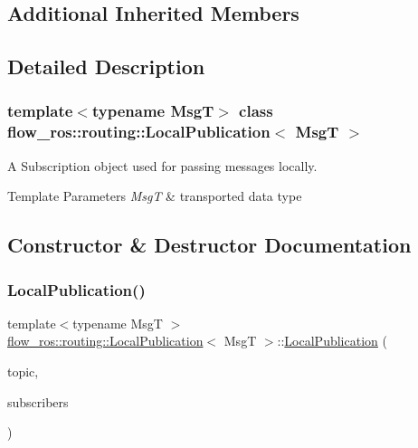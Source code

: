 \subsection*{Additional Inherited Members}


\subsection{Detailed Description}
\subsubsection*{template$<$typename MsgT$>$\newline
class flow\+\_\+ros\+::routing\+::\+Local\+Publication$<$ Msg\+T $>$}

A Subscription object used for passing messages locally. 


\begin{DoxyTemplParams}{Template Parameters}
{\em MsgT} & transported data type \\
\hline
\end{DoxyTemplParams}


\subsection{Constructor \& Destructor Documentation}
\mbox{\label{classflow__ros_1_1routing_1_1_local_publication_a1430b9009fbb39639d69faa0545b8ec8}} 
\subsubsection{\texorpdfstring{Local\+Publication()}{LocalPublication()}}
{\footnotesize\ttfamily template$<$typename MsgT $>$ \\
\hyperlink{classflow__ros_1_1routing_1_1_local_publication}{flow\+\_\+ros\+::routing\+::\+Local\+Publication}$<$ MsgT $>$\+::\hyperlink{classflow__ros_1_1routing_1_1_local_publication}{Local\+Publication} (\begin{DoxyParamCaption}\item[{std\+::string}]{topic,  }\item[{std\+::shared\+\_\+ptr$<$ \hyperlink{classflow__ros_1_1routing_1_1_local_subscription_group}{Local\+Subscription\+Group} $>$}]{subscribers }\end{DoxyParamCaption})\hspace{0.3cm}{\ttfamily [inline]}}



